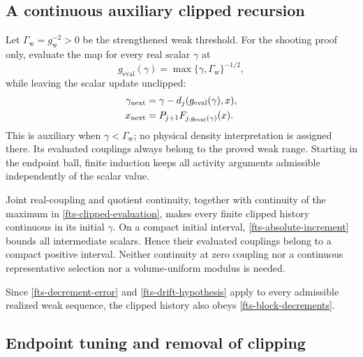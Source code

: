 \documentclass[11pt]{article}
\theoremstyle{remark}
\begin{document}
\subsection{A continuous auxiliary clipped recursion}
\label{fts-clipping-section}

Let $\Gamma_{\mathrm w}=g_{\mathrm w}^{-2}>0$ be the
strengthened weak threshold. For the shooting proof only,
evaluate the map for every real scalar $\gamma$ at
\begin{equation}
 g_{\mathrm{eval}}(\gamma)
       =\max\{\gamma,\Gamma_{\mathrm w}\}^{-1/2},
 \label{fts-clipped-evaluation}
\end{equation}
while leaving the scalar update unclipped:
\begin{align}
 \gamma_{\mathrm{next}}
       &=\gamma-d_j(g_{\mathrm{eval}}(\gamma),x),\notag\\
 x_{\mathrm{next}}
       &=P_{j+1}F_{j,g_{\mathrm{eval}}(\gamma)}(x).
 \label{fts-clipped-update}
\end{align}
This is auxiliary when $\gamma<\Gamma_{\mathrm w}$; no
physical density interpretation is assigned there.
Its evaluated couplings always belong to the proved weak
range. Starting in the endpoint ball, finite induction
keeps all activity arguments admissible independently
of the scalar value.

Joint real-coupling and quotient continuity, together with
continuity of the maximum in
\eqref{fts-clipped-evaluation}, makes every finite clipped
history continuous in its initial $\gamma$. On a compact
initial interval, \eqref{fts-absolute-increment} bounds all
intermediate scalars. Hence their evaluated couplings
belong to a compact positive interval. Neither continuity
at zero coupling nor a continuous representative selection
nor a volume-uniform modulus is needed.

Since \eqref{fts-decrement-error} and
\eqref{fts-drift-hypothesis} apply to every admissible
realized weak sequence, the clipped history also obeys
\eqref{fts-block-decrements}.

\subsection{Endpoint tuning and removal of clipping}
\label{fts-tuning-section}
\end{document}
